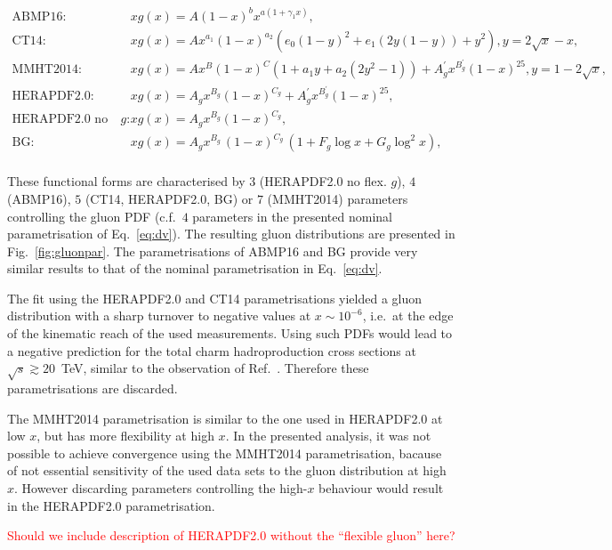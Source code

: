 \documentclass[12pt]{article}
\begin{document}
\begin{equation}
\begin{aligned}
\textrm{ABMP16:}~~~~~~ &xg(x)=A (1 - x)^b x^{a (1 + \gamma_{1} x)},\\
\textrm{CT14:}~~~~~~ &xg(x) = Ax^{a_1}(1-x)^{a_2}(e_0(1-y)^2+e_1(2y(1-y))+y^2), y=2\sqrt{x}-x,\\
\textrm{MMHT2014:}~~~~~~ &xg(x) = Ax^B(1-x)^C(1+a_1y+a_2(2y^2-1))+A^{\prime}_gx^{B^{\prime}_g}(1-x)^{25}, y=1-2\sqrt{x},\\ 
\textrm{HERAPDF2.0:}~~~~~~ &xg(x)=A_gx^{B_g}(1-x)^{C_g}+A^{\prime}_gx^{B^{\prime}_g}(1-x)^{25},\\
\textrm{HERAPDF2.0 no flex. $g$:}~~~~~~ &xg(x)=A_gx^{B_g}(1-x)^{C_g},\\
\textrm{BG:}~~~~~~ &xg(x)=A_{g} x^{B_{g}}\,(1-x)^{C_{g}}\, (1 + F_{g} {\log x} + G_{g} {\log^2 x}),\\
\end{aligned}
\label{eq:gluonpar}
\end{equation}

These functional forms are characterised by $3$ (HERAPDF2.0 no flex. $g$), $4$ (ABMP16), $5$ (CT14, HERAPDF2.0, BG) or $7$ (MMHT2014) parameters controlling the gluon PDF (c.f.\ $4$ parameters in the presented nominal parametrisation of Eq.~\ref{eq:dv}). 
The resulting gluon distributions are presented in Fig.~\ref{fig:gluonpar}. The parametrisations of ABMP16 and BG provide very similar results to that of the nominal parametrisation in Eq.~\ref{eq:dv}. 

The fit using the HERAPDF2.0 and CT14 parametrisations yielded a gluon distribution with a sharp turnover to negative values 
at $x \sim 10^{-6}$, i.e.\ at the edge of the kinematic reach of the used measurements. Using such PDFs would 
lead to a negative prediction for the total charm hadroproduction cross sections at $\sqrt{s} \gtrsim 20$~TeV, similar to the observation of Ref.~\cite{Accardi:2016ndt}. Therefore these parametrisations are discarded. 

The MMHT2014 parametrisation is similar to the one used in HERAPDF2.0 at low $x$, but has more flexibility at high $x$. 
In the presented analysis, it was not possible to achieve convergence using the MMHT2014 parametrisation, bacause of not essential sensitivity of the used data sets to the gluon distribution at high $x$. However discarding parameters controlling 
the high-$x$ behaviour would result in the HERAPDF2.0 parametrisation.

\textcolor{red}{Should we include description of HERAPDF2.0 without the ``flexible gluon'' here?}
\end{document}
